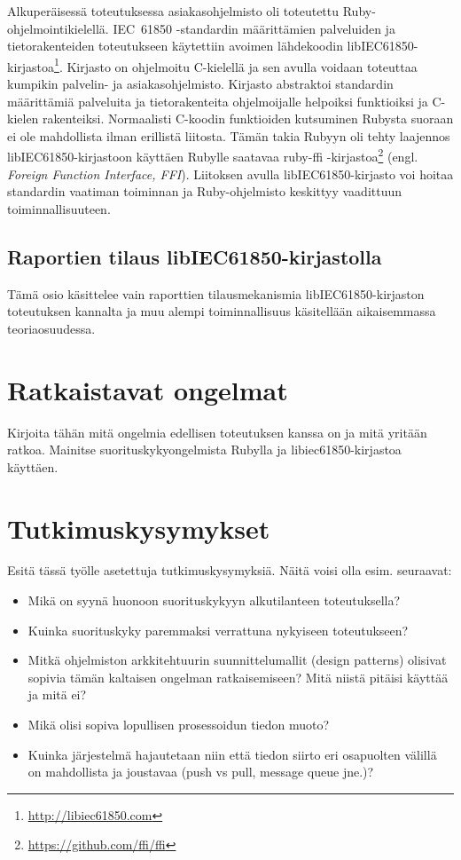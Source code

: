 Alkuperäisessä toteutuksessa asiakasohjelmisto oli toteutettu Ruby-ohjelmointikielellä. IEC~61850 -standardin määrittämien palveluiden ja tietorakenteiden toteutukseen käytettiin avoimen lähdekoodin libIEC61850-kirjastoa\footnote{\url{http://libiec61850.com}}. Kirjasto on ohjelmoitu C-kielellä ja sen avulla voidaan toteuttaa kumpikin palvelin- ja asiakasohjelmisto. Kirjasto abstraktoi standardin määrittämiä palveluita ja tietorakenteita ohjelmoijalle helpoiksi funktioiksi ja C-kielen rakenteiksi. Normaalisti C-koodin funktioiden kutsuminen Rubysta suoraan ei ole mahdollista ilman erillistä liitosta. Tämän takia Rubyyn oli tehty laajennos libIEC61850-kirjastoon käyttäen Rubylle saatavaa ruby-ffi -kirjastoa\footnote{\url{https://github.com/ffi/ffi}} (engl. \emph{Foreign Function Interface, FFI}). Liitoksen avulla libIEC61850-kirjasto voi hoitaa standardin vaatiman toiminnan ja Ruby-ohjelmisto keskittyy vaadittuun toiminnallisuuteen.

\subsection{Raportien tilaus libIEC61850-kirjastolla}
\begin{it}
	Tämä osio käsittelee vain raporttien tilausmekanismia libIEC61850-kirjaston toteutuksen kannalta ja muu alempi toiminnallisuus käsitellään aikaisemmassa teoriaosuudessa.
\end{it}



\section{Ratkaistavat ongelmat}
Kirjoita tähän mitä ongelmia edellisen toteutuksen kanssa on ja mitä yritään ratkoa. Mainitse suorituskykyongelmista Rubylla ja libiec61850-kirjastoa käyttäen.

\section{Tutkimuskysymykset}
Esitä tässä työlle asetettuja tutkimuskysymyksiä. Näitä voisi olla esim. seuraavat:
\begin{itemize}
	\item Mikä on syynä huonoon suorituskykyyn alkutilanteen toteutuksella?
	\item Kuinka suorituskyky paremmaksi verrattuna nykyiseen toteutukseen?
	\item Mitkä ohjelmiston arkkitehtuurin suunnittelumallit (design patterns) olisivat sopivia tämän kaltaisen ongelman ratkaisemiseen? Mitä niistä pitäisi käyttää ja mitä ei?
	\item Mikä olisi sopiva lopullisen prosessoidun tiedon muoto?
	\item Kuinka järjestelmä hajautetaan niin että tiedon siirto eri osapuolten välillä on mahdollista ja joustavaa (push vs pull, message queue jne.)?
\end{itemize}